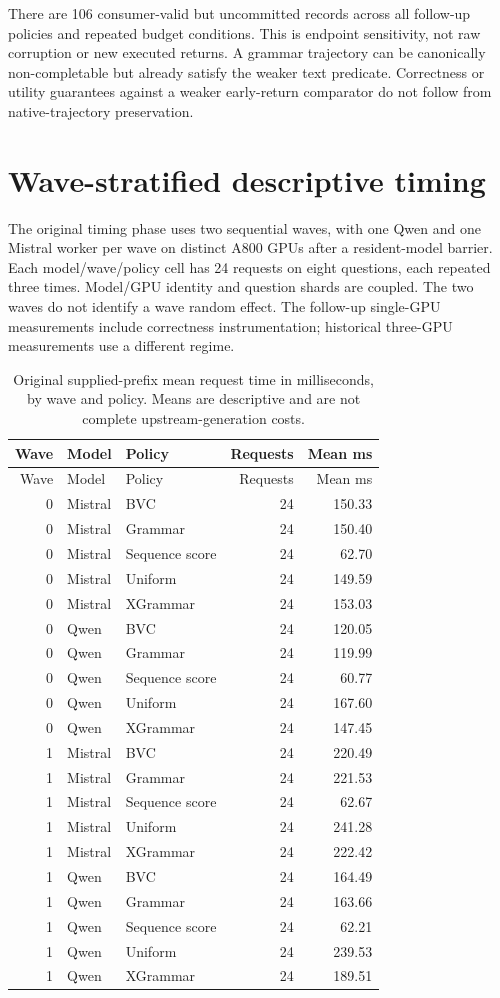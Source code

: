 \documentclass[12pt,a4paper]{article}
\begin{document}
There are 106 consumer-valid but uncommitted records across all follow-up policies and repeated budget conditions. This is endpoint sensitivity, not raw corruption or new executed returns. A grammar trajectory can be canonically non-completable but already satisfy the weaker text predicate. Correctness or utility guarantees against a weaker early-return comparator do not follow from native-trajectory preservation.

\section{Wave-stratified descriptive timing}
The original timing phase uses two sequential waves, with one Qwen and one Mistral worker per wave on distinct A800 GPUs after a resident-model barrier. Each model/wave/policy cell has 24 requests on eight questions, each repeated three times. Model/GPU identity and question shards are coupled. The two waves do not identify a wave random effect. The follow-up single-GPU measurements include correctness instrumentation; historical three-GPU measurements use a different regime.
\begin{longtable}{@{}rllrr@{}}
\caption{Original supplied-prefix mean request time in milliseconds, by wave and policy. Means are descriptive and are not complete upstream-generation costs.}\label{tab:timing}\\
\toprule
Wave & Model & Policy & Requests & Mean ms \\
\midrule
\endfirsthead
\toprule
Wave & Model & Policy & Requests & Mean ms \\
\midrule
\endhead
0 & Mistral & BVC & 24 & 150.33 \\
0 & Mistral & Grammar & 24 & 150.40 \\
0 & Mistral & Sequence score & 24 & 62.70 \\
0 & Mistral & Uniform & 24 & 149.59 \\
0 & Mistral & XGrammar & 24 & 153.03 \\
0 & Qwen & BVC & 24 & 120.05 \\
0 & Qwen & Grammar & 24 & 119.99 \\
0 & Qwen & Sequence score & 24 & 60.77 \\
0 & Qwen & Uniform & 24 & 167.60 \\
0 & Qwen & XGrammar & 24 & 147.45 \\
1 & Mistral & BVC & 24 & 220.49 \\
1 & Mistral & Grammar & 24 & 221.53 \\
1 & Mistral & Sequence score & 24 & 62.67 \\
1 & Mistral & Uniform & 24 & 241.28 \\
1 & Mistral & XGrammar & 24 & 222.42 \\
1 & Qwen & BVC & 24 & 164.49 \\
1 & Qwen & Grammar & 24 & 163.66 \\
1 & Qwen & Sequence score & 24 & 62.21 \\
1 & Qwen & Uniform & 24 & 239.53 \\
1 & Qwen & XGrammar & 24 & 189.51 \\
\bottomrule
\end{longtable}
\end{document}

